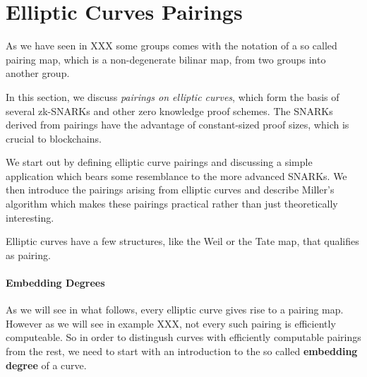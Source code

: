 
\section{Elliptic Curves Pairings} As we have seen in XXX some groups comes with the notation of a so called pairing map, which is a non-degenerate bilinar map, from two groups into another group.

In this section, we discuss \textit{pairings on elliptic curves}, which form the basis of several zk-SNARKs and other zero knowledge proof schemes. The SNARKs derived from pairings have the advantage of constant-sized proof sizes, which is crucial to blockchains. 

We start out by defining elliptic curve pairings and discussing a simple application which bears some resemblance to the more advanced SNARKs. We then introduce the pairings arising from elliptic curves and describe Miller's algorithm which makes these pairings practical rather than just theoretically interesting.

Elliptic curves have a few structures, like the Weil or the Tate map, that qualifies as pairing.   

\paragraph{Embedding Degrees}As we will see in what follows, every elliptic curve gives rise to a pairing map. However as we will see in example XXX, not every such pairing is efficiently computeable. So in order to distingush curves with efficiently computable pairings from the rest, we need to start with an introduction to the so called \textbf{embedding degree} of a curve. 

